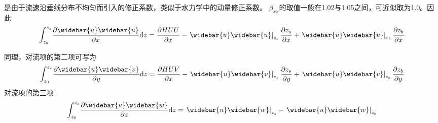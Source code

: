                                 是由于流速沿垂线分布不均匀而引入的修正系数，类似于水力学中的动量修正系数。
                                $\beta_{xx}$的取值一般在1.02与1.05之间，可近似取为1.0。因此
                                \begin{equation}
                                  \int_{z_0}^{ z_{s}}\!
                                  \frac{\partial \widebar{u}\widebar{u}}{\partial x}
                                  \mathrm{d}z
                                  =
                                  \frac{\partial HUU}{\partial x}
                                  -
                                  \left.\widebar{u}\widebar{u}\right|_{z_{s}}\frac{\partial  z_{s}}{\partial x}
                                    +
                                    \left.\widebar{u}\widebar{u}\right|_{z_{b}}\frac{\partial z_{b}}{\partial x}
                                    \end{equation}

                                    同理，对流项的第二项可写为
                                    \begin{equation}
                                      \int_{z_0}^{ z_{s}}\!
                                      \frac{\partial \widebar{u}\widebar{v}}{\partial y}
                                      \mathrm{d}z
                                      =
                                      \frac{\partial HUV}{\partial x}
                                      -
                                      \left.\widebar{u}\widebar{v}\right|_{z_{s}}\frac{\partial  z_{s}}{\partial y}
                                        +
                                        \left.\widebar{u}\widebar{v}\right|_{z_{b}}\frac{\partial z_{b}}{\partial y}
                                        \end{equation}
                                        对流项的第三项
                                        \begin{equation}
                                          \int_{z_0}^{ z_{s}}\!
                                          \frac{\partial \widebar{u}\widebar{w}}{\partial z}
                                          \mathrm{d}z
                                          =
                                          \left.\widebar{u}\widebar{w}\right|_{z_{s}}
                                            -
                                            \left.\widebar{u}\widebar{w}\right|_{z_{b}}
                                            \end{equation}

